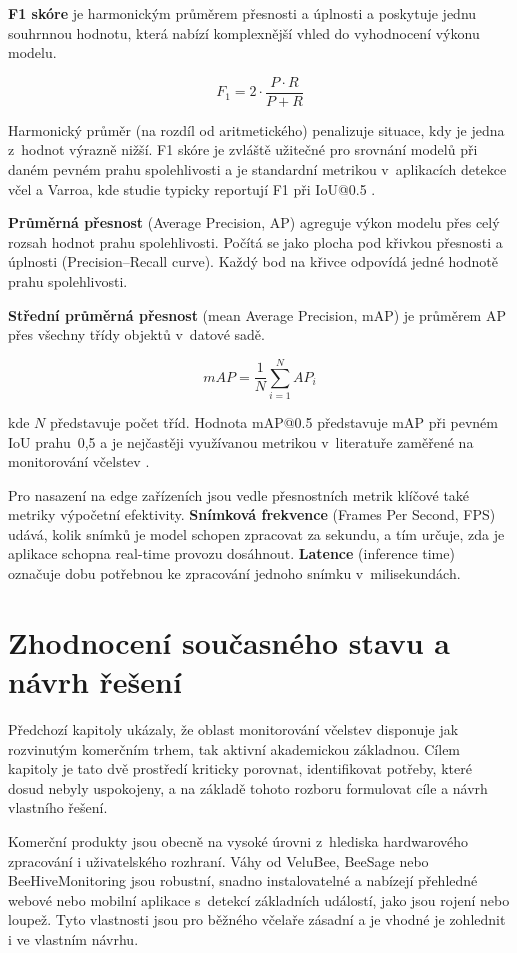 \textbf{F1 skóre} je harmonickým průměrem přesnosti a úplnosti a poskytuje jednu souhrnnou hodnotu, která nabízí komplexnější vhled do vyhodnocení výkonu modelu.

\[F_1 = 2 \cdot \frac{P \cdot R}{P + R}\]

Harmonický průměr (na rozdíl od aritmetického) penalizuje situace, kdy je jedna z~hodnot výrazně nižší. F1 skóre je zvláště užitečné pro srovnání modelů při daném pevném prahu spolehlivosti a je standardní metrikou v~aplikacích detekce včel a Varroa, kde studie typicky reportují F1 při IoU@0.5 \cite{Bilik2021}.

\textbf{Průměrná přesnost} (Average Precision, AP) agreguje výkon modelu přes celý rozsah hodnot prahu spolehlivosti. Počítá se jako plocha pod křivkou přesnosti a úplnosti (Precision–Recall curve). Každý bod na křivce odpovídá jedné hodnotě prahu spolehlivosti.

\textbf{Střední průměrná přesnost} (mean Average Precision, mAP) je průměrem AP přes všechny třídy objektů v~datové sadě.

\[mAP = \frac{1}{N} \sum_{i = 1}^N AP_i\]

kde \(N\) představuje počet tříd. Hodnota mAP@0.5 představuje mAP při pevném IoU prahu~0,5 a je nejčastěji využívanou metrikou v~literatuře zaměřené na monitorování včelstev \cite{Bilik2021}. 

Pro nasazení na edge zařízeních jsou vedle přesnostních metrik klíčové také metriky výpočetní efektivity. \textbf{Snímková frekvence} (Frames Per Second, FPS) udává, kolik snímků je model schopen zpracovat za sekundu, a tím určuje, zda je aplikace schopna real-time provozu dosáhnout. \textbf{Latence} (inference time) označuje dobu potřebnou ke zpracování jednoho snímku v~milisekundách.

\chapter{Zhodnocení současného stavu a návrh řešení} \label{sec:zhodnoceni_navrh}
Předchozí kapitoly ukázaly, že oblast monitorování včelstev disponuje jak rozvinutým komerčním trhem, tak aktivní akademickou základnou. Cílem kapitoly je tato dvě prostředí kriticky porovnat, identifikovat potřeby, které dosud nebyly uspokojeny, a na základě tohoto rozboru formulovat cíle a návrh vlastního řešení.

Komerční produkty jsou obecně na vysoké úrovni z~hlediska hardwarového zpracování i uživatelského rozhraní. Váhy od VeluBee, BeeSage nebo BeeHiveMonitoring jsou robustní, snadno instalovatelné a nabízejí přehledné webové nebo mobilní aplikace s~detekcí základních událostí, jako jsou rojení nebo loupež. Tyto vlastnosti jsou pro běžného včelaře zásadní a je vhodné je zohlednit i ve vlastním návrhu. 

